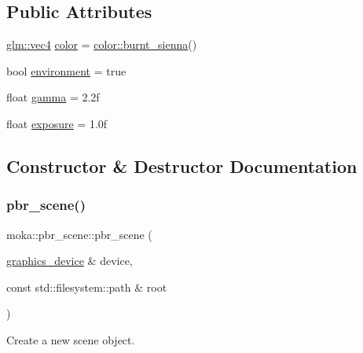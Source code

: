 \subsection*{Public Attributes}
\begin{DoxyCompactItemize}
\item 
\mbox{\hyperlink{namespacemoka_aed2224bc0e5b79e57a8975ded94ee1aaa1a9028fd802c481a99491a418ca2fe86}{glm\+::vec4}} \mbox{\hyperlink{classmoka_1_1pbr__scene_a3ce3c08ad020ecb47c7b06317fc5b162}{color}} = \mbox{\hyperlink{classmoka_1_1colour_adf150ab92519483a781f5f42e5161284}{color\+::burnt\+\_\+sienna}}()
\item 
bool \mbox{\hyperlink{classmoka_1_1pbr__scene_a8f57699b3f259cefe33abd4d83f6ca22}{environment}} = true
\item 
float \mbox{\hyperlink{classmoka_1_1pbr__scene_a5cb93bbd8f5157363ea52f2569606189}{gamma}} = 2.\+2f
\item 
float \mbox{\hyperlink{classmoka_1_1pbr__scene_a32d74b9d00c4b1f0eab85a4155f64c2e}{exposure}} = 1.\+0f
\end{DoxyCompactItemize}


\subsection{Constructor \& Destructor Documentation}
\mbox{\label{classmoka_1_1pbr__scene_a6a5516f94cf0297f838aa3b819216fe9}} 
\subsubsection{\texorpdfstring{pbr\_scene()}{pbr\_scene()}\hspace{0.1cm}{\footnotesize\ttfamily [1/2]}}
{\footnotesize\ttfamily moka\+::pbr\+\_\+scene\+::pbr\+\_\+scene (\begin{DoxyParamCaption}\item[{\mbox{\hyperlink{classmoka_1_1graphics__device}{graphics\+\_\+device}} \&}]{device,  }\item[{const std\+::filesystem\+::path \&}]{root }\end{DoxyParamCaption})\hspace{0.3cm}{\ttfamily [inline]}}



Create a new scene object. 


